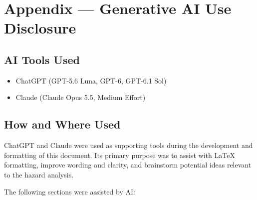 \documentclass{article}
\newcounter{hazard}
\begin{document}
\newpage{}

\section{Appendix --- Generative AI Use Disclosure}

\subsection{AI Tools Used}

\begin{itemize}
  \item ChatGPT (GPT-5.6 Luna, GPT-6, GPT-6.1 Sol)
  \item Claude (Claude Opus 5.5, Medium Effort)
\end{itemize}

\subsection{How and Where Used}

ChatGPT and Claude were used as supporting tools during the development and formatting
of this document. Its primary purpose was to assist with \LaTeX{} formatting,
improve wording and clarity, and brainstorm potential ideas relevant to the
hazard analysis.

The following sections were assisted by AI:
\end{document}
